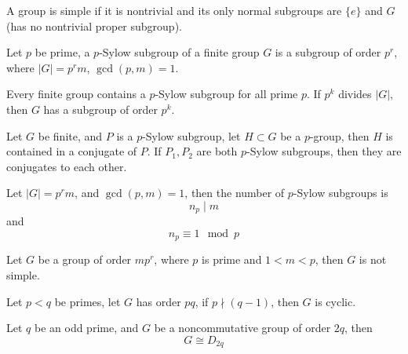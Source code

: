 \documentclass[openany]{book}
\begin{document}
\begin{defn}[simple]
    A group is simple if it is nontrivial and its only normal subgroups are $\{e\}$ and $G$ (has no nontrivial proper subgroup).
\end{defn}

\begin{defn}
    Let $p$ be prime, a $p$-Sylow subgroup of a finite group $G$ is a subgroup of order $p^r$, where $|G|=p^rm$, $\gcd(p,m)=1$. 
\end{defn}

\begin{thm}[Sylow I]
    Every finite group contains a $p$-Sylow subgroup for all prime $p$. If $p^k$ divides $|G|$, then $G$ has a subgroup of order $p^k$.
\end{thm}

\begin{thm}[Sylow II]
    Let $G$ be finite, and $P$ is a $p$-Sylow subgroup, let $H\subset G$ be a $p$-group, then $H$ is contained in a conjugate of $P$. If $P_1,P_2$ are both $p$-Sylow subgroups, then they are conjugates to each other.
\end{thm}

\begin{thm}
    Let $|G|=p^rm$, and $\gcd(p,m)=1$, then the number of $p$-Sylow subgroups is 
    \begin{equation*}
        n_p\mid m 
    \end{equation*}
    and 
    \begin{equation*}
        n_p\equiv 1\mod p
    \end{equation*}
\end{thm}

\begin{prop}
    Let $G$ be a group of order $mp^r$, where $p$ is prime and $1<m<p$, then $G$ is not simple.
\end{prop}


\begin{prop}
    Let $p<q$ be primes, let $G$ has order $pq$, if $p\nmid (q-1)$, then $G$ is cyclic.
\end{prop}

\begin{prop}
    Let $q$ be an odd prime, and $G$ be a noncommutative group of order $2q$, then 
    \begin{equation*}
        G\cong D_{2q}
    \end{equation*}
\end{prop}
\end{document}
